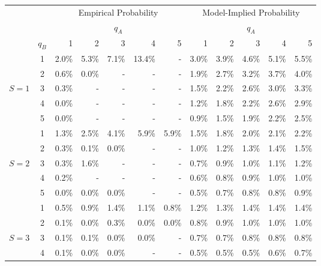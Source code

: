 \documentclass[11pt]{article}
\begin{document}
\begin{table}[!htbp]
    \centering
        \begin{adjustbox}{max width=\textwidth}
            \begin{tabular}{c c r r r r r |r r r r r}\toprule
             & &\multicolumn{5}{c}{Empirical Probability}& \multicolumn{5}{c}{Model-Implied Probability}  \\ \cmidrule{3-12}
              & &\multicolumn{5}{c}{$q_A$}& \multicolumn{5}{c}{$q_A$}  \\ \cmidrule{3-12}
             & $q_B$ & 1 & 2 & 3 & 4 & 5 & 1 & 2 & 3 & 4 & 5 \\ \midrule
             & 1 & 2.0\% & 5.3\% & 7.1\% & 13.4\% & - & 3.0\% & 3.9\% & 4.6\% & 5.1\% & 5.5\%  \\
             & 2 & 0.6\% & 0.0\% & -      & -      & - & 1.9\% & 2.7\% & 3.2\% & 3.7\% & 4.0\% \\
             $S=1$ & 3 & 0.3\% & -      & -      & -      & - & 1.5\% & 2.2\% & 2.6\% & 3.0\% & 3.3\%\\
             & 4 & 0.0\% & - & - & - & - & 1.2\% & 1.8\% & 2.2\% & 2.6\% & 2.9\%\\
             & 5 & 0.0\% & - & - & - & - & 0.9\% & 1.5\% & 1.9\% & 2.2\% & 2.5\%\\ \midrule
             & 1 & 1.3\% & 2.5\% & 4.1\% & 5.9\% & 5.9\% & 1.5\% & 1.8\% & 2.0\% & 2.1\% & 2.2\%\\
             & 2 & 0.3\% & 0.1\% & 0.0\% & -      & - & 1.0\% & 1.2\% & 1.3\% & 1.4\% & 1.5\%\\
             $S=2$ & 3 & 0.3\% & 1.6\% & -      & -      & - & 0.7\% & 0.9\% & 1.0\% & 1.1\% & 1.2\%\\
             & 4 & 0.2\% & -      & -      & -      & - & 0.6\% & 0.8\% & 0.9\% & 1.0\% & 1.0\%\\
             & 5 & 0.0\% & 0.0\% & 0.0\% & - & - & 0.5\% & 0.7\% & 0.8\% & 0.8\% & 0.9\%\\ \midrule
             & 1 & 0.5\% & 0.9\% & 1.4\% & 1.1\% & 0.8\% & 1.2\% & 1.3\% & 1.4\% & 1.4\% & 1.4\%\\
             & 2 & 0.1\% & 0.0\% & 0.3\% & 0.0\% & 0.0\% & 0.8\% & 0.9\% & 1.0\% & 1.0\% & 1.0\%\\
             $S=3$ & 3 & 0.1\% & 0.1\% & 0.0\% & 0.0\% & - & 0.7\% & 0.7\% & 0.8\% & 0.8\% & 0.8\%\\
             & 4 & 0.1\% & 0.0\% & 0.0\% & -  & - & 0.5\% & 0.5\% & 0.5\% & 0.6\% & 0.7\%\\

\end{tabular}
\end{adjustbox}
\end{table}
\end{document}
